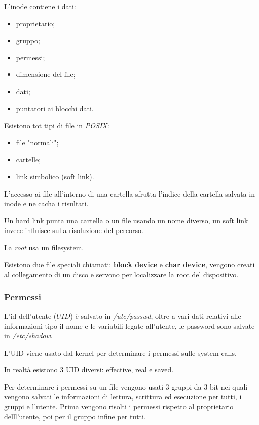 L'inode contiene i dati:
\begin{itemize}
  \item proprietario;
  \item gruppo;
  \item permessi;
  \item dimensione del file;
  \item dati;
  \item puntatori ai blocchi dati.
\end{itemize}

Esistono tot tipi di file in \emph{POSIX}:
\begin{itemize}
  \item file "normali";
  \item cartelle;
  \item link simbolico (soft link).
\end{itemize}

L'accesso ai file all'interno di una cartella sfrutta l'indice della cartella
salvata in inode e ne cacha i risultati.

Un hard link punta una cartella o un file usando un nome diverso, un soft link
invece influisce sulla risoluzione del percorso.

La \emph{root} usa un filesystem.

Esistono due file speciali chiamati: \textbf{block device} e \textbf{char 
device}, vengono creati al collegamento di un disco e servono per localizzare
la root del dispositivo.

\subsubsection{Permessi}
L'id dell'utente ($UID$) è salvato in \emph{/utc/passwd}, oltre a vari dati
relativi alle informazioni tipo il nome e le variabili legate all'utente,
le password sono salvate in \emph{/etc/shadow}.

L'UID viene usato dal kernel per determinare i permessi sulle system calls.

In realtà esistono $3$ UID diversi: effective, real e saved.

Per determinare i permessi su un file vengono usati $3$ gruppi da $3$ bit nei
quali vengono salvati le informazioni di lettura, scrittura ed esecuzione per
tutti, i gruppi e l'utente.
Prima vengono risolti i permessi rispetto al proprietario delll'utente, poi
per il gruppo infine per tutti.
